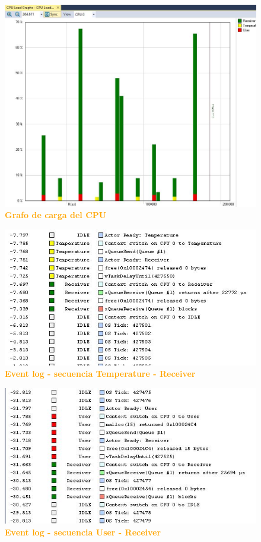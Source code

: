 \documentclass{article}
\begin{document}
\begin{figure}[H]
   \centering
   \includegraphics[width=1.0\textwidth]{figures/trace16.jpg}
   \centering
   \caption{\textbf{\textcolor{Orange}{Grafo de carga del CPU}}}
\end{figure}


\begin{figure}[H]
   \centering
   \includegraphics[width=1.0\textwidth]{figures/trace17.jpg}
   \centering
   \caption{\textbf{\textcolor{Orange}{Event log - secuencia Temperature - Receiver}}}
\end{figure}


\begin{figure}[H]
   \centering
   \includegraphics[width=1.0\textwidth]{figures/trace18.jpg}
   \centering
   \caption{\textbf{\textcolor{Orange}{Event log - secuencia User - Receiver}}}
\end{figure}
\end{document}
